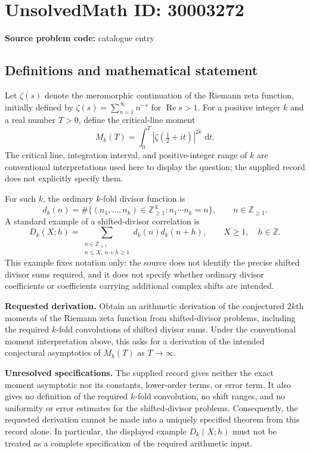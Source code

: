 \documentclass[11pt]{article}
\newcommand{\Z}{\mathbb{Z}}
\newcommand{\dd}{\,\mathrm{d}}
\begin{document}
\section*{UnsolvedMath ID: 30003272}
\textbf{Source problem code:} catalogue entry
\subsection{Definitions and mathematical statement}
Let \(\zeta(s)\) denote the meromorphic continuation of the Riemann zeta function, initially defined by \(\zeta(s)=\sum_{n=1}^{\infty}n^{-s}\) for \(\operatorname{Re}s>1\). For a positive integer \(k\) and a real number \(T>0\), define the critical-line moment
\[
M_k(T)=\int_0^T\left|\zeta\!\left(\tfrac12+it\right)\right|^{2k}\,\dd t.
\]
The critical line, integration interval, and positive-integer range of \(k\) are conventional interpretations used here to display the question; the supplied record does not explicitly specify them.

For such \(k\), the ordinary \(k\)-fold divisor function is
\[
d_k(n)=\#\{(n_1,\ldots,n_k)\in\Z_{\geq1}^{\,k}:n_1\cdots n_k=n\},\qquad n\in\Z_{\geq1}.
\]
A standard example of a shifted-divisor correlation is
\[
D_k(X;h)=\sum_{\substack{n\in\Z_{\geq1}\\n\leq X,\ n+h\geq1}}d_k(n)d_k(n+h),
\qquad X\geq1,\quad h\in\Z.
\]
This example fixes notation only: the source does not identify the precise shifted divisor sums required, and it does not specify whether ordinary divisor coefficients or coefficients carrying additional complex shifts are intended.

\textbf{Requested derivation.} Obtain an arithmetic derivation of the conjectured \(2k\)th moments of the Riemann zeta function from shifted-divisor problems, including the required \(k\)-fold convolutions of shifted divisor sums. Under the conventional moment interpretation above, this asks for a derivation of the intended conjectural asymptotics of \(M_k(T)\) as \(T\to\infty\).

\textbf{Unresolved specifications.} The supplied record gives neither the exact moment asymptotic nor its constants, lower-order terms, or error term. It also gives no definition of the required \(k\)-fold convolution, no shift ranges, and no uniformity or error estimates for the shifted-divisor problems. Consequently, the requested derivation cannot be made into a uniquely specified theorem from this record alone. In particular, the displayed example \(D_k(X;h)\) must not be treated as a complete specification of the required arithmetic input.
\end{document}
